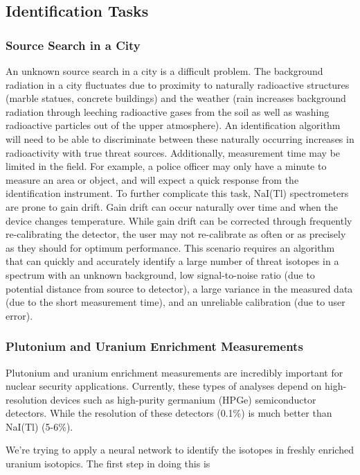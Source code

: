 \documentclass[10pt,letterpaper]{article}
\begin{document}
\subsection{Identification Tasks}

\subsubsection{Source Search in a City}
An unknown source search in a city is a difficult problem. The background radiation in a city fluctuates due to proximity to naturally radioactive structures (marble statues, concrete buildings) and the weather (rain increases background radiation through leeching radioactive gases from the soil as well as washing radioactive particles out of the upper atmosphere). An identification algorithm will need to be able to discriminate between these naturally occurring increases in radioactivity with true threat sources. Additionally, measurement time may be limited in the field. For example, a police officer may only have a minute to measure an area or object, and will expect a quick response from the identification instrument. To further complicate this task, NaI(Tl) spectrometers are prone to gain drift. Gain drift can occur naturally over time and when the device changes temperature. While gain drift can be corrected through frequently re-calibrating the detector, the user may not re-calibrate as often or as precisely as they should for optimum performance. This scenario requires an algorithm that can quickly and accurately identify a large number of threat isotopes in a spectrum with an unknown background, low signal-to-noise ratio (due to potential distance from source to detector), a large variance in the measured data (due to the short measurement time), and an unreliable calibration (due to user error).

\subsubsection{Plutonium and Uranium Enrichment Measurements}

Plutonium and uranium enrichment measurements are incredibly important for nuclear security applications. Currently, these types of analyses depend on high-resolution devices such as high-purity germanium (HPGe) semiconductor detectors. While the resolution of these detectors (0.1\%) is much better than NaI(Tl) (5-6\%).

We're trying to apply a neural network to identify the isotopes in freshly enriched uranium isotopics. The first step in doing this is 
\end{document}
